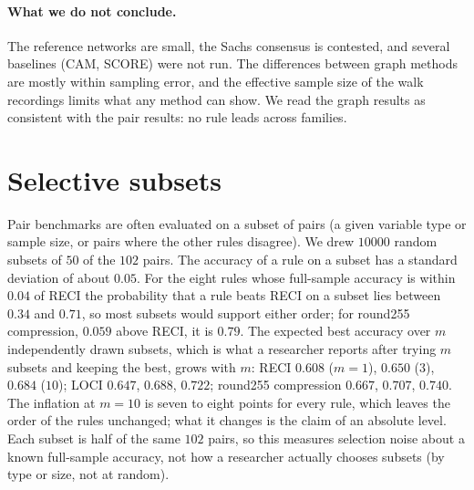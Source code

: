 \paragraph{What we do not conclude.} The reference networks are small, the Sachs consensus is contested, and several baselines (CAM, SCORE) were not run. The differences between graph methods are mostly within sampling error, and the effective sample size of the walk recordings limits what any method can show. We read the graph results as consistent with the pair results: no rule leads across families.



\section{Selective subsets}\label{app:subsets}


Pair benchmarks are often evaluated on a subset of pairs (a given variable type or sample size, or pairs where the other rules disagree). We drew $10000$ random subsets of $50$ of the $102$ pairs. The accuracy of a rule on a subset has a standard deviation of about $0.05$. For the eight rules whose full-sample accuracy is within $0.04$ of RECI the probability that a rule beats RECI on a subset lies between $0.34$ and $0.71$, so most subsets would support either order; for round255 compression, $0.059$ above RECI, it is $0.79$. The expected best accuracy over $m$ independently drawn subsets, which is what a researcher reports after trying $m$ subsets and keeping the best, grows with $m$: RECI $0.608$ ($m=1$), $0.650$ ($3$), $0.684$ ($10$); LOCI $0.647$, $0.688$, $0.722$; round255 compression $0.667$, $0.707$, $0.740$. The inflation at $m=10$ is seven to eight points for every rule, which leaves the order of the rules unchanged; what it changes is the claim of an absolute level. Each subset is half of the same $102$ pairs, so this measures selection noise about a known full-sample accuracy, not how a researcher actually chooses subsets (by type or size, not at random).







